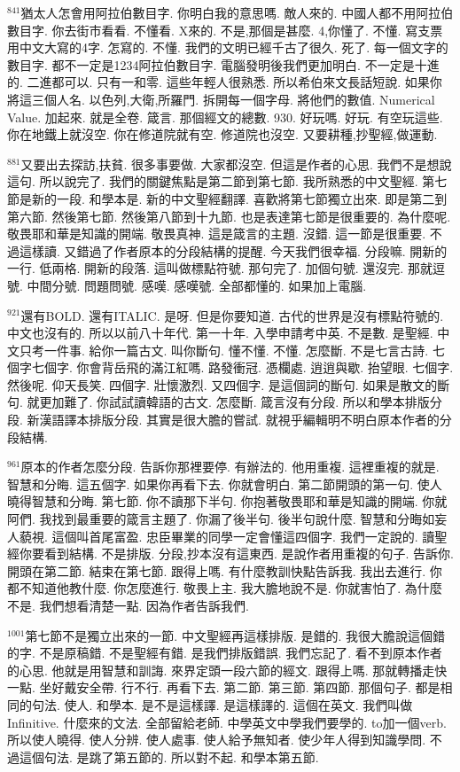 \documentclass{book}
\begin{document}
$^{841}$猶太人怎會用阿拉伯數目字.
你明白我的意思嗎.
敵人來的.
中國人都不用阿拉伯數目字.
你去街市看看.
不懂看.
X來的.
不是,那個是甚麼.
4,你懂了.
不懂.
寫支票用中文大寫的4字.
怎寫的.
不懂.
我們的文明已經千古了很久.
死了.
每一個文字的數目字.
都不一定是1234阿拉伯數目字.
電腦發明後我們更加明白.
不一定是十進的.
二進都可以.
只有一和零.
這些年輕人很熟悉.
所以希伯來文長話短說.
如果你將這三個人名.
以色列,大衛,所羅門.
拆開每一個字母.
將他們的數值.
Numerical Value.
加起來.
就是全卷.
箴言.
那個經文的總數.
930.
好玩嗎.
好玩.
有空玩這些.
你在地鐵上就沒空.
你在修道院就有空.
修道院也沒空.
又要耕種,抄聖經,做運動.

$^{881}$又要出去探訪,扶貧.
很多事要做.
大家都沒空.
但這是作者的心思.
我們不是想說這句.
所以說完了.
我們的關鍵焦點是第二節到第七節.
我所熟悉的中文聖經.
第七節是新的一段.
和學本是.
新的中文聖經翻譯.
喜歡將第七節獨立出來.
即是第二到第六節.
然後第七節.
然後第八節到十九節.
也是表達第七節是很重要的.
為什麼呢.
敬畏耶和華是知識的開端.
敬畏真神.
這是箴言的主題.
沒錯.
這一節是很重要.
不過這樣讀.
又錯過了作者原本的分段結構的提醒.
今天我們很幸福.
分段嘛.
開新的一行.
低兩格.
開新的段落.
這叫做標點符號.
那句完了.
加個句號.
還沒完.
那就逗號.
中間分號.
問題問號.
感嘆.
感嘆號.
全部都懂的.
如果加上電腦.

$^{921}$還有BOLD.
還有ITALIC.
是呀.
但是你要知道.
古代的世界是沒有標點符號的.
中文也沒有的.
所以以前八十年代.
第一十年.
入學申請考中英.
不是數.
是聖經.
中文只考一件事.
給你一篇古文.
叫你斷句.
懂不懂.
不懂.
怎麼斷.
不是七言古詩.
七個字七個字.
你會背岳飛的滿江紅嗎.
路發衝冠.
憑欄處.
逍逍與歇.
抬望眼.
七個字.
然後呢.
仰天長笑.
四個字.
壯懷激烈.
又四個字.
是這個詞的斷句.
如果是散文的斷句.
就更加難了.
你試試讀韓語的古文.
怎麼斷.
箴言沒有分段.
所以和學本排版分段.
新漢語譯本排版分段.
其實是很大膽的嘗試.
就視乎編輯明不明白原本作者的分段結構.

$^{961}$原本的作者怎麼分段.
告訴你那裡要停.
有辦法的.
他用重複.
這裡重複的就是.
智慧和分晦.
這五個字.
如果你再看下去.
你就會明白.
第二節開頭的第一句.
使人曉得智慧和分晦.
第七節.
你不讀那下半句.
你抱著敬畏耶和華是知識的開端.
你就阿們.
我找到最重要的箴言主題了.
你漏了後半句.
後半句說什麼.
智慧和分晦如妄人藐視.
這個叫首尾富盈.
忠臣畢業的同學一定會懂這四個字.
我們一定說的.
讀聖經你要看到結構.
不是排版.
分段,抄本沒有這東西.
是說作者用重複的句子.
告訴你.
開頭在第二節.
結束在第七節.
跟得上嗎.
有什麼教訓快點告訴我.
我出去進行.
你都不知道他教什麼.
你怎麼進行.
敬畏上主.
我大膽地說不是.
你就害怕了.
為什麼不是.
我們想看清楚一點.
因為作者告訴我們.

$^{1001}$第七節不是獨立出來的一節.
中文聖經再這樣排版.
是錯的.
我很大膽說這個錯的字.
不是原稿錯.
不是聖經有錯.
是我們排版錯誤.
我們忘記了.
看不到原本作者的心思.
他就是用智慧和訓誨.
來界定頭一段六節的經文.
跟得上嗎.
那就轉播走快一點.
坐好戴安全帶.
行不行.
再看下去.
第二節.
第三節.
第四節.
那個句子.
都是相同的句法.
使人.
和學本.
是不是這樣譯.
是這樣譯的.
這個在英文.
我們叫做Infinitive.
什麼來的文法.
全部留給老師.
中學英文中學我們要學的.
to加一個verb.
所以使人曉得.
使人分辨.
使人處事.
使人給予無知者.
使少年人得到知識學問.
不過這個句法.
是跳了第五節的.
所以對不起.
和學本第五節.
\end{document}
